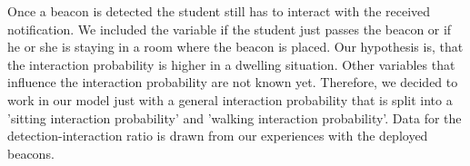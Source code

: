 Once a beacon is detected the student still has to interact with the received notification. We included the variable if the student just passes the beacon or if he or she is staying in a room where the beacon is placed. Our hypothesis is, that the interaction probability is higher in a dwelling situation. Other variables that influence the interaction probability are not known yet. Therefore, we decided to work in our model just with a general interaction probability that is split into a 'sitting interaction probability' and 'walking interaction probability'. Data for the detection-interaction ratio is drawn from our experiences with the deployed beacons.